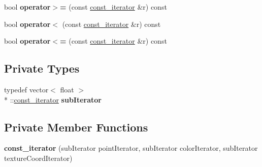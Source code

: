 \begin{DoxyCompactItemize}
\item 
\hypertarget{classMesh__t_1_1const__iterator_a376992b96fd309bce6335e4ad4c564f7}{bool {\bfseries operator$>$=} (const \hyperlink{classMesh__t_1_1const__iterator}{const\+\_\+iterator} \&r) const }\label{classMesh__t_1_1const__iterator_a376992b96fd309bce6335e4ad4c564f7}

\item 
\hypertarget{classMesh__t_1_1const__iterator_ab072053e0d01075225a883405e5e6953}{bool {\bfseries operator$<$} (const \hyperlink{classMesh__t_1_1const__iterator}{const\+\_\+iterator} \&r) const }\label{classMesh__t_1_1const__iterator_ab072053e0d01075225a883405e5e6953}

\item 
\hypertarget{classMesh__t_1_1const__iterator_a6ed80538dc270a480f24efeca60a2c39}{bool {\bfseries operator$<$=} (const \hyperlink{classMesh__t_1_1const__iterator}{const\+\_\+iterator} \&r) const }\label{classMesh__t_1_1const__iterator_a6ed80538dc270a480f24efeca60a2c39}

\end{DoxyCompactItemize}
\subsection*{Private Types}
\begin{DoxyCompactItemize}
\item 
\hypertarget{classMesh__t_1_1const__iterator_a2b700a6a28c6afcf4573ad39077cb24c}{typedef vector$<$ float $>$\\*
\+::\hyperlink{classMesh__t_1_1const__iterator}{const\+\_\+iterator} {\bfseries sub\+Iterator}}\label{classMesh__t_1_1const__iterator_a2b700a6a28c6afcf4573ad39077cb24c}

\end{DoxyCompactItemize}
\subsection*{Private Member Functions}
\begin{DoxyCompactItemize}
\item 
\hypertarget{classMesh__t_1_1const__iterator_a26e718515dda633e3681a1d4659e35b6}{{\bfseries const\+\_\+iterator} (sub\+Iterator point\+Iterator, sub\+Iterator color\+Iterator, sub\+Iterator texture\+Coord\+Iterator)}\label{classMesh__t_1_1const__iterator_a26e718515dda633e3681a1d4659e35b6}

\end{DoxyCompactItemize}
